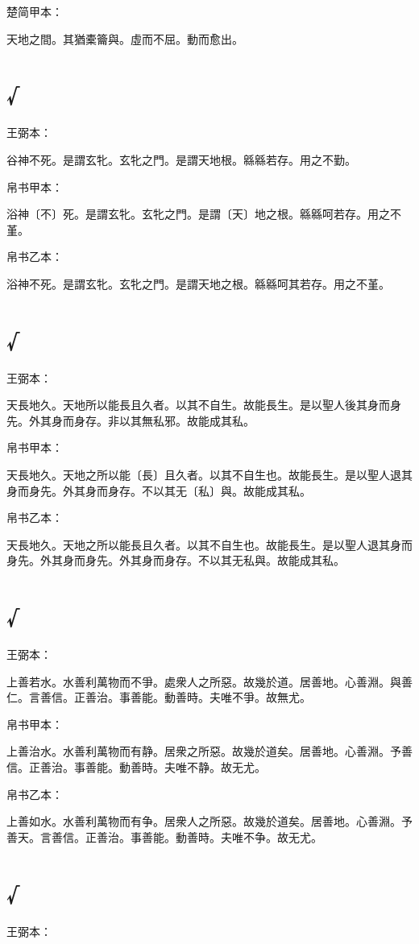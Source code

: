 \documentclass[a5paper]{ctexbook}
\begin{document}
    楚简甲本：

    天地之間。其猶橐籥與。虛而不屈。動而愈出。

    \chapter{√}
    王弼本：

    谷神不死。是謂玄牝。玄牝之門。是謂天地根。緜緜若存。用之不勤。

    
    帛书甲本：

    浴神〔不〕死。是謂玄牝。玄牝之門。是謂〔天〕地之根。緜緜呵若存。用之不堇。

    帛书乙本：

    浴神不死。是謂玄牝。玄牝之門。是謂天地之根。緜緜呵其若存。用之不堇。

    \chapter{√}
    王弼本：

    天長地久。天地所以能長且久者。以其不自生。故能長生。是以聖人後其身而身先。外其身而身存。非以其無私邪。故能成其私。

    
    帛书甲本：

    天長地久。天地之所以能〔長〕且久者。以其不自生也。故能長生。是以聖人退其身而身先。外其身而身存。不以其无〔私〕與。故能成其私。

    帛书乙本：

    天長地久。天地之所以能長且久者。以其不自生也。故能長生。是以聖人退其身而身先。外其身而身先。外其身而身存。不以其无私與。故能成其私。

    \chapter{√}
    王弼本：

    上善若水。水善利萬物而不爭。處衆人之所惡。故幾於道。居善地。心善淵。與善仁。言善信。正善治。事善能。動善時。夫唯不爭。故無尤。

    
    帛书甲本：

    上善治水。水善利萬物而有静。居衆之所惡。故幾於道矣。居善地。心善淵。予善信。正善治。事善能。動善時。夫唯不静。故无尤。

    帛书乙本：

    上善如水。水善利萬物而有争。居衆人之所惡。故幾於道矣。居善地。心善淵。予善天。言善信。正善治。事善能。動善時。夫唯不争。故无尤。

    \chapter{√}
    王弼本：
\end{document}
